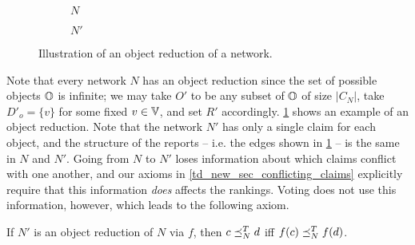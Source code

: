 \begin{figure}
    \centering
        \begin{subfigure}{.4\textwidth}
            \centering
            \caption{$N$}
        \end{subfigure}
        \begin{subfigure}{.4\textwidth}
            \centering
            \caption{$N'$}
        \end{subfigure}
    \caption{
        Illustration of an object reduction of a network.
    }
    \label{td_new_fig_object_reduction}
\end{figure}

Note that every network $N$ has an object reduction since the set of
possible objects $\mathbb{O}$ is infinite; we may take $O'$ to be any subset of $\mathbb{O}$ of
size $|C_N|$, take $D'_o = \{v\}$ for some fixed $v \in \mathbb{V}$, and set $R'$
accordingly.
%
\cref{td_new_fig_object_reduction} shows an example of an object reduction.
Note that the network $N'$ has only a single claim for each object, and the
structure of the reports -- i.e. the edges shown in
\cref{td_new_fig_object_reduction} -- is the same in $N$ and $N'$. Going from
$N$ to $N'$ loses information about which claims conflict with one another, and
our axioms in \cref{td_new_sec_conflicting_claims} explicitly require that this
information \emph{does} affects the rankings. Voting does not use this
information, however, which leads to the following axiom.

\begin{axiom}[\objectirrelevance]
    If $N'$ is an object reduction of $N$ via $f$, then $c \preceq_N^T d$ iff
    $f(c) \preceq_N^T f(d)$.
\end{axiom}

